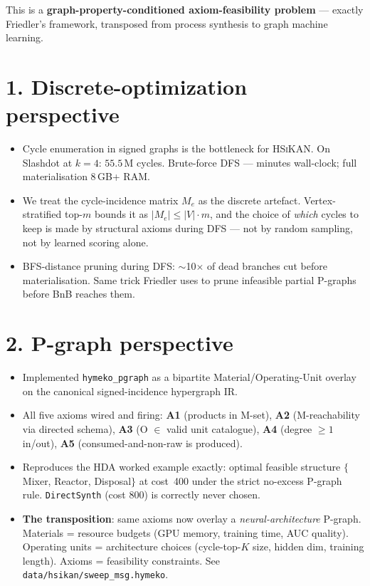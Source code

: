 \documentclass[11pt,a4paper]{article}
\newcommand{\HSiKAN}{\textsc{HSiKAN}}
\newcommand{\code}[1]{\texttt{\small #1}}
\begin{document}
This is a \textbf{graph-property-conditioned axiom-feasibility
problem} --- exactly Friedler's framework, transposed from process
synthesis to graph machine learning.

\section*{1. Discrete-optimization perspective}

\begin{itemize}
\item Cycle enumeration in signed graphs is the bottleneck for
      \HSiKAN. On Slashdot at $k{=}4$: $55.5$\,M cycles. Brute-force
      DFS --- minutes wall-clock; full materialisation 8\,GB+ RAM.
\item We treat the cycle-incidence matrix $M_e$ as the discrete
      artefact. Vertex-stratified top-$m$ bounds it as
      $|M_e| \le |V| \cdot m$, and the choice of \emph{which} cycles
      to keep is made by structural axioms during DFS --- not by
      random sampling, not by learned scoring alone.
\item BFS-distance pruning during DFS: $\sim$10$\times$ of dead
      branches cut before materialisation. Same trick Friedler uses
      to prune infeasible partial P-graphs before BnB reaches them.
\end{itemize}

\section*{2. P-graph perspective}

\begin{itemize}
\item Implemented \code{hymeko\_pgraph} as a bipartite
      Material/Operating-Unit overlay on the canonical
      signed-incidence hypergraph IR.
\item All five axioms wired and firing: \textbf{A1} (products in
      M-set), \textbf{A2} (M-reachability via directed schema),
      \textbf{A3} (O $\in$ valid unit catalogue), \textbf{A4} (degree
      $\geq 1$ in/out), \textbf{A5} (consumed-and-non-raw is produced).
\item Reproduces the HDA worked example exactly: optimal feasible
      structure $\{$Mixer, Reactor, Disposal$\}$ at cost~400 under
      the strict no-excess P-graph rule. \code{DirectSynth} (cost
      800) is correctly never chosen.
\item \textbf{The transposition}: same axioms now overlay a
      \emph{neural-architecture} P-graph. Materials = resource
      budgets (GPU memory, training time, AUC quality). Operating
      units = architecture choices (cycle-top-$K$ size, hidden dim,
      training length). Axioms = feasibility constraints. See
      \code{data/hsikan/sweep\_msg.hymeko}.
\end{itemize}
\end{document}
